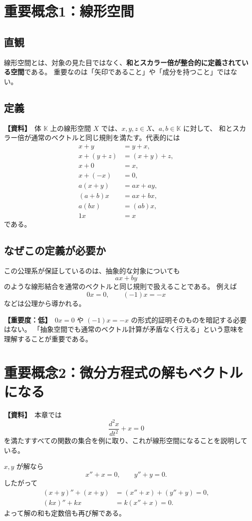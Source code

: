 \documentclass[a4paper,11pt]{ltjsarticle}
\newcommand{\K}{\mathbb{K}}
\newcommand{\sourceitem}{\textbf{【資料】}}
\newcommand{\lowimportance}{\textbf{【重要度：低】}}
\begin{document}
\section{重要概念1：線形空間}

\subsection{直観}
線形空間とは、対象の見た目ではなく、\textbf{和とスカラー倍が整合的に定義されている空間}である。
重要なのは「矢印であること」や「成分を持つこと」ではない。

\subsection{定義}
\sourceitem\ 体 $\K$ 上の線形空間 $X$ では、$x,y,z\in X$、$a,b\in\K$ に対して、
和とスカラー倍が通常のベクトルと同じ規則を満たす。代表的には
\begin{align*}
 x+y &= y+x,\\
 x+(y+z) &= (x+y)+z,\\
 x+0 &= x,\\
 x+(-x) &= 0,\\
 a(x+y) &= ax+ay,\\
 (a+b)x &= ax+bx,\\
 a(bx) &= (ab)x,\\
 1x &= x
\end{align*}
である。

\subsection{なぜこの定義が必要か}
この公理系が保証しているのは、抽象的な対象についても
\[
ax+by
\]
のような線形結合を通常のベクトルと同じ規則で扱えることである。
例えば
\[
0x=0,\qquad (-1)x=-x
\]
などは公理から導かれる。

\lowimportance\ $0x=0$ や $(-1)x=-x$ の形式的証明そのものを暗記する必要はない。
「抽象空間でも通常のベクトル計算が矛盾なく行える」という意味を理解することが重要である。

\section{重要概念2：微分方程式の解もベクトルになる}

\sourceitem\ 本章では
\[
\frac{d^2x}{dt^2}+x=0
\]
を満たすすべての関数の集合を例に取り、これが線形空間になることを説明している。

$x,y$ が解なら
\[
x''+x=0,\qquad y''+y=0.
\]
したがって
\begin{align*}
(x+y)''+(x+y)
&=(x''+x)+(y''+y)=0,\\
(kx)''+kx
&=k(x''+x)=0.
\end{align*}
よって解の和も定数倍も再び解である。
\end{document}
